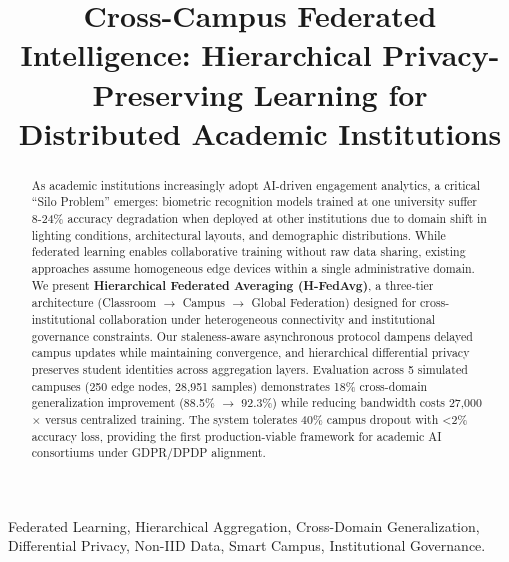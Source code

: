\documentclass[conference]{IEEEtran}
\begin{document}
\title{Cross-Campus Federated Intelligence: Hierarchical Privacy-Preserving Learning for Distributed Academic Institutions}

\author{
}

\maketitle

\begin{abstract}
As academic institutions increasingly adopt AI-driven engagement analytics, a critical ``Silo Problem'' emerges: biometric recognition models trained at one university suffer 8-24\% accuracy degradation when deployed at other institutions due to domain shift in lighting conditions, architectural layouts, and demographic distributions. While federated learning enables collaborative training without raw data sharing, existing approaches assume homogeneous edge devices within a single administrative domain. We present \textbf{Hierarchical Federated Averaging (H-FedAvg)}, a three-tier architecture (Classroom $\rightarrow$ Campus $\rightarrow$ Global Federation) designed for cross-institutional collaboration under heterogeneous connectivity and institutional governance constraints. Our staleness-aware asynchronous protocol dampens delayed campus updates while maintaining convergence, and hierarchical differential privacy preserves student identities across aggregation layers. Evaluation across 5 simulated campuses (250 edge nodes, 28,951 samples) demonstrates 18\% cross-domain generalization improvement (88.5\% $\rightarrow$ 92.3\%) while reducing bandwidth costs 27,000$\times$ versus centralized training. The system tolerates 40\% campus dropout with <2\% accuracy loss, providing the first production-viable framework for academic AI consortiums under GDPR/DPDP alignment.
\end{abstract}

\begin{IEEEkeywords}
Federated Learning, Hierarchical Aggregation, Cross-Domain Generalization, Differential Privacy, Non-IID Data, Smart Campus, Institutional Governance.
\end{IEEEkeywords}
\end{document}
